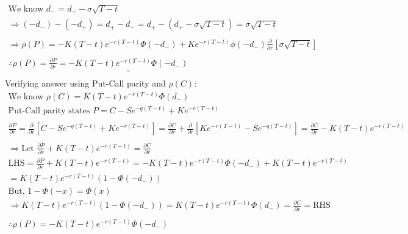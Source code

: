 \documentclass[letterpaper,10pt]{article}
\newcommand{\doubleu}[1]{\underline{\underline{#1}}}
\newcommand{\partiald}[2]{\frac{\partial #1}{\partial #2}}
\begin{document}
\begin{gather*}
				\\
				\text{We know } d_- = d_+ - \sigma \sqrt{T-t} \\
				\Rightarrow (-d_-) - (-d_+) = d_+ - d_- = d_+ - (d_+ - \sigma \sqrt{T-t}) = \sigma\sqrt{T-t} \\
				\\
				\Rightarrow \rho(P) = - K (T-t) e^{-r(T-t)} \Phi(-d_-) + Ke^{-r(T-t)}\phi(-d_-)\partiald{}{r}\left[ \sigma\sqrt{T-t} \right] \\
				\\
				\therefore \rho(P) = \partiald{P}{r} = \doubleu{- K (T-t) e^{-r(T-t)} \Phi(-d_-)}
				\\
			\end{gather*}
			Verifying answer using Put-Call parity and $\rho(C)$:
			\begin{gather*}
				\text{We know } \rho(C) = K(T-t) e^{-r(T-t)} \Phi(d_-) \\
				\text{Put-Call parity states } P = C - Se^{-q(T-t)} + Ke^{-r(T-t)} \\
				\\
				\partiald{P}{r} = \partiald{}{r} \left[ C - Se^{-q(T-t)} + Ke^{-r(T-t)} \right] = \partiald{C}{r} + \partiald{}{r} \left[ Ke^{-r(T-t)} - Se^{-q(T-t)} \right] = \partiald{C}{r} - K(T-t)e^{-r(T-t)} \\
				\\
				\Rightarrow \text{Let } \partiald{P}{r} + K(T-t)e^{-r(T-t)} = \partiald{C}{r} \\
				\text{LHS} = \partiald{P}{r} + K(T-t)e^{-r(T-t)} = - K (T-t) e^{-r(T-t)} \Phi(-d_-) + K(T-t)e^{-r(T-t)} \\
				= K(T-t)e^{-r(T-t)}(1-\Phi(-d_-)) \\
				\text{But, } 1-\Phi(-x) = \Phi(x) \\
				\Rightarrow K(T-t)e^{-r(T-t)}(1-\Phi(-d_-)) = K(T-t)e^{-r(T-t)} \Phi(d_-) = \partiald{C}{r} = \text{RHS} \\
				\\
				\boxed{\therefore \rho(P) = - K (T-t) e^{-r(T-t)} \Phi(-d_-)}
			\end{gather*}
\end{document}
